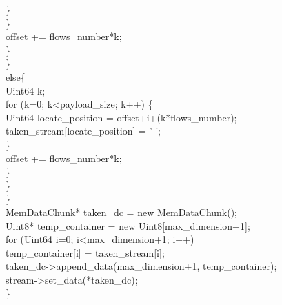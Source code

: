 \begin{code}
						\}\\
					\}\\
					offset += flows\_number*k;\\
				\}\\
			\}\\
			else\{\\
				Uint64 k;\\
				for (k=0; k<payload\_size; k++) \{\\
					Uint64 locate\_position = offset+i+(k*flows\_number);\\
					taken\_stream[locate\_position] = ' ';\\
				\}\\
				offset += flows\_number*k;\\
			\}\\
		\}\\
	\}\\
	MemDataChunk* taken\_dc = new MemDataChunk();\\
	Uint8* temp\_container = new Uint8[max\_dimension+1];\\
	for (Uint64 i=0; i<max\_dimension+1; i++)\\
		temp\_container[i] = taken\_stream[i];\\
	taken\_dc->append\_data(max\_dimension+1, temp\_container);\\
	stream->set\_data(*taken\_dc);\\
\}\\
\end{code}
